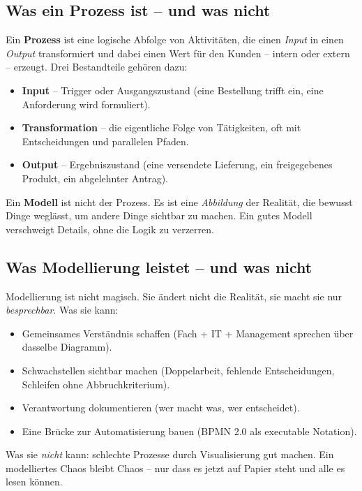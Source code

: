 \documentclass[11pt,a4paper,oneside]{article}
\newcommand{\fachbegriff}[1]{\textbf{#1}}
\begin{document}
\subsection{Was ein Prozess ist -- und was nicht}

Ein \fachbegriff{Prozess} ist eine logische Abfolge von Aktivitäten, die einen \emph{Input} in einen \emph{Output} transformiert und dabei einen Wert für den Kunden -- intern oder extern -- erzeugt. Drei Bestandteile gehören dazu:

\begin{itemize}
  \item \textbf{Input} -- Trigger oder Ausgangszustand (eine Bestellung trifft ein, eine Anforderung wird formuliert).
  \item \textbf{Transformation} -- die eigentliche Folge von Tätigkeiten, oft mit Entscheidungen und parallelen Pfaden.
  \item \textbf{Output} -- Ergebniszustand (eine versendete Lieferung, ein freigegebenes Produkt, ein abgelehnter Antrag).
\end{itemize}

Ein \fachbegriff{Modell} ist nicht der Prozess. Es ist eine \emph{Abbildung} der Realität, die bewusst Dinge weglässt, um andere Dinge sichtbar zu machen. Ein gutes Modell verschweigt Details, ohne die Logik zu verzerren.

\subsection{Was Modellierung leistet -- und was nicht}

Modellierung ist nicht magisch. Sie ändert nicht die Realität, sie macht sie nur \emph{besprechbar}. Was sie kann:

\begin{itemize}
  \item Gemeinsames Verständnis schaffen (Fach + IT + Management sprechen über dasselbe Diagramm).
  \item Schwachstellen sichtbar machen (Doppelarbeit, fehlende Entscheidungen, Schleifen ohne Abbruchkriterium).
  \item Verantwortung dokumentieren (wer macht was, wer entscheidet).
  \item Eine Brücke zur Automatisierung bauen (BPMN 2.0 als executable Notation).
\end{itemize}

Was sie \emph{nicht} kann: schlechte Prozesse durch Visualisierung gut machen. Ein modelliertes Chaos bleibt Chaos -- nur dass es jetzt auf Papier steht und alle es lesen können.
\end{document}
